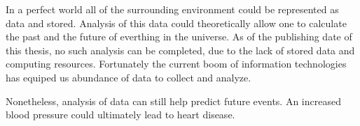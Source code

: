 In a perfect world all of the surrounding environment could be represented as data and stored.
Analysis of this data could theoretically allow one to calculate the past and the future of everthing in the universe.
As of the publishing date of this thesis, no such analysis can be completed, due to the lack of stored data and computing resources. 
Fortunately the current boom of information technologies has equiped us abundance of data to collect and analyze.

Nonetheless, analysis of data can still help predict future events. An increased blood pressure could ultimately lead to heart disease.